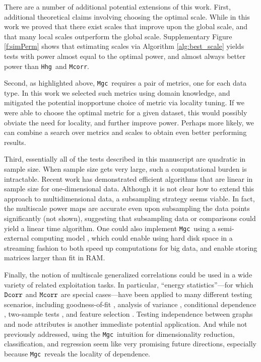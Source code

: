 \documentclass[11pt]{article}
\providecommand{\sct}[1]{{\sc \texttt{#1}}}
\newcommand{\Mgc}{\sct{Mgc}}
\newcommand{\Hhg}{\sct{Hhg}}
\newcommand{\Dcorr}{\sct{Dcorr}}
\newcommand{\Mcorr}{\sct{Mcorr}}
\begin{document}
There are a number of additional potential extensions of this work.  First, additional theoretical claims involving choosing the optimal scale. 
While in this work we proved that there exist scales that improve upon the global scale, and that many local scales outperform the global scale.
Supplementary Figure \ref{f:simPerm} shows that estimating scales via Algorithm \ref{alg:best_scale} yields tests with power almost equal to the optimal power, and almost always better power than \Hhg~and \Mcorr.  



Second, as highlighted above, \Mgc~requires a pair of metrics, one for each data type. In this work we selected such metrics using domain knowledge, and mitigated the potential inopportune choice of metric via locality tuning.  If we were able to choose the optimal metric for a given dataset, this would possibly obviate the need for locality, and further improve power.  Perhaps more likely, we can combine a search over metrics and scales to obtain even better performing results.  

Third, essentially all of the tests described in this manuscript are quadratic in sample size.  When sample size gets very large, such a computational burden is intractable.  Recent work has demonstrated efficient algorithms that are linear in sample size \cite{Hou2016} for one-dimensional data.  Although it is not clear how to extend this approach to multidimensional data, a subsampling strategy seems viable.  In fact, the multiscale power maps are accurate even upon subsampling the data points significantly (not shown), suggesting that subsampling data or comparisons  could yield a linear time algorithm.  One could also implement \Mgc~using a semi-external computing model \cite{Zheng2016},  which could enable using hard disk space in a streaming fashion to both speed up computations for big data, and enable storing matrices larger than fit in RAM.

Finally, the notion of multiscale generalized correlations could be used in a wide variety of related exploitation tasks.  In particular, ``energy statistics''---for which $\Dcorr$ and $\Mcorr$ are special cases---have been applied to many different testing scenarios, including goodness-of-fit  \cite{Szekely2005}, analysis of variance  \cite{Rizzo2010}, conditional dependence  \cite{Szekely2014,Wang2015},  two-sample tests \cite{Szekely2004}, and feature selection \cite{LiZhongZhu2012,Zhong2015}.   
Testing independence between graphs and node attributes \cite{Fosdick2015} is another immediate potential application.  And while not previously addressed, using the \Mgc~intuition for dimensionality reduction, classification, and regression seem like very promising future directions, especially because \Mgc~reveals the locality of dependence.
\end{document}
